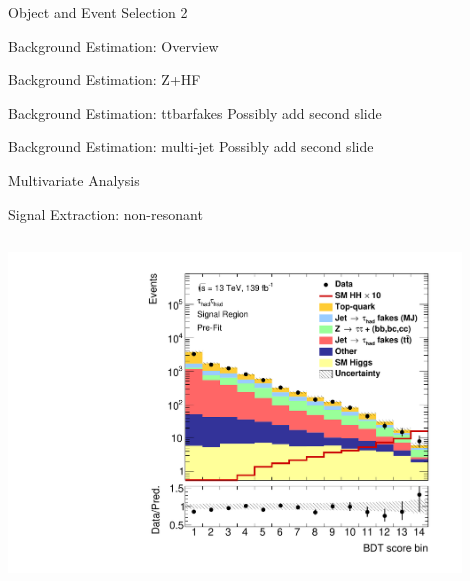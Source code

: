 \documentclass[11pt, xcolor={dvipsnames}, aspectratio=169]{beamer}
\begin{document}

\begin{frame}{Object and Event Selection 2}
\end{frame}


\begin{frame}{Background Estimation: Overview}
\end{frame}


\begin{frame}{Background Estimation: Z+HF}
\end{frame}


\begin{frame}{Background Estimation: ttbarfakes}
  Possibly add second slide
\end{frame}


\begin{frame}{Background Estimation: multi-jet}
  Possibly add second slide
\end{frame}


\begin{frame}{Multivariate Analysis}
\end{frame}


\begin{frame}{Signal Extraction: non-resonant}
  \begin{columns}

    \centering
    \includegraphics[width=0.9\textwidth]{mva/prefit/Region_BMin0_incJet1_distSMBDT_J2_Y2015_DLLOS_T2_SpcTauHH_L0_Prefitlog}
  \end{columns}
\end{frame}
\end{document}
